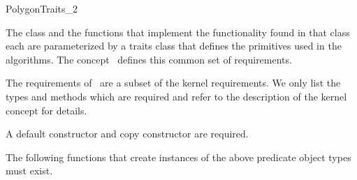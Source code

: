 

\begin{ccRefConcept}{PolygonTraits_2}


\ccDefinition

The  class and the functions that implement the functionality
found in that class each are parameterized by a traits class that defines the
primitives used in the algorithms.
The concept \ccRefName\ defines this common set of requirements.

The requirements of \ccRefName\ are a subset of the kernel requirements.
We only list the types and methods which are required and refer to the
description of the kernel concept for details.

\ccTypes


\ccCreation
{}  

A default constructor and copy constructor are required.

\ccOperations

The following functions that create instances of the above predicate object
types must exist.






\end{ccRefConcept}
